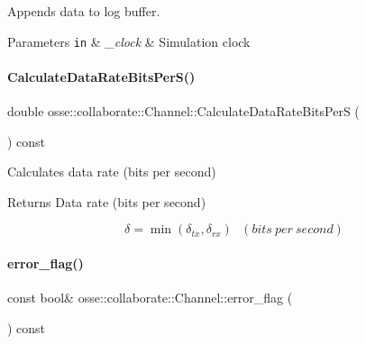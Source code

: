 Appends data to log buffer. 


\begin{DoxyParams}[1]{Parameters}
\mbox{\tt in}  & {\em \+\_\+clock} & Simulation clock \\
\hline
\end{DoxyParams}
\mbox{\label{classosse_1_1collaborate_1_1_channel_a82f92a2447146dccb81de8557994afb9}} 
\paragraph{\texorpdfstring{Calculate\+Data\+Rate\+Bits\+Per\+S()}{CalculateDataRateBitsPerS()}}
{\footnotesize\ttfamily double osse\+::collaborate\+::\+Channel\+::\+Calculate\+Data\+Rate\+Bits\+PerS (\begin{DoxyParamCaption}{ }\end{DoxyParamCaption}) const\hspace{0.3cm}{\ttfamily [private]}}



Calculates data rate (bits per second) 

\begin{DoxyReturn}{Returns}
Data rate (bits per second)
\end{DoxyReturn}
\[ \delta = \min{(\delta_{tx}, \delta_{rx})} ~~~ (bits~per~second) \] \mbox{\label{classosse_1_1collaborate_1_1_channel_ad6f31877da7e33e97a454bad6d00b93a}} 
\paragraph{\texorpdfstring{error\+\_\+flag()}{error\_flag()}}
{\footnotesize\ttfamily const bool\& osse\+::collaborate\+::\+Channel\+::error\+\_\+flag (\begin{DoxyParamCaption}{ }\end{DoxyParamCaption}) const\hspace{0.3cm}{\ttfamily [inline]}}



